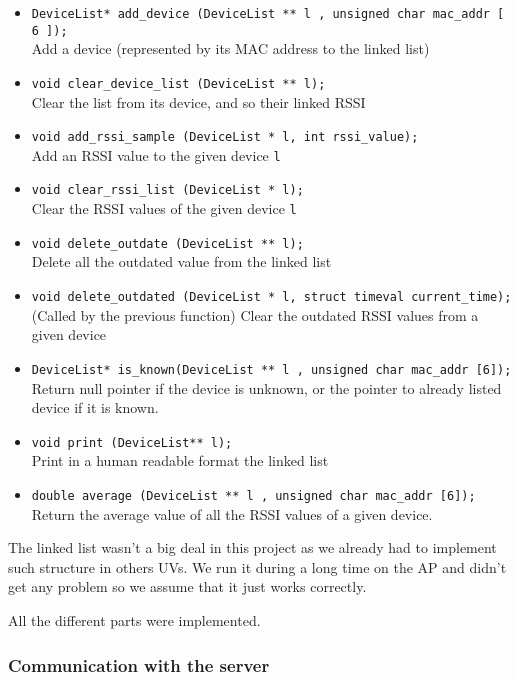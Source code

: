 \begin{itemize}
    \item \verb+DeviceList* add_device (DeviceList ** l , unsigned char mac_addr [ 6 ]);+\\
        Add a device (represented by its MAC address to the linked list)
    \item \verb+void clear_device_list (DeviceList ** l);+\\
        Clear the list from its device, and so their linked RSSI 
    \item \verb+void add_rssi_sample (DeviceList * l, int rssi_value);+\\
        Add an RSSI value to the given device \verb+l+
    \item \verb+void clear_rssi_list (DeviceList * l);+\\
        Clear the RSSI values of the given device \verb+l+
    \item \verb+void delete_outdate (DeviceList ** l);+\\
        Delete all the outdated value from the linked list
    \item \verb+void delete_outdated (DeviceList * l, struct timeval current_time);+\\
        (Called by the previous function) Clear the outdated RSSI values from a
        given device
    \item \verb+DeviceList* is_known(DeviceList ** l , unsigned char mac_addr [6]);+\\
        Return null pointer if the device is unknown, or the pointer to already
        listed device if it is known. 
    \item \verb+void print (DeviceList** l);+\\
        Print in a human readable format the linked list
    \item \verb+double average (DeviceList ** l , unsigned char mac_addr [6]);+\\
        Return the average value of all the RSSI values of a given device.
\end{itemize}

The linked list wasn't a big deal in this project as we already had to
implement such structure in others UVs. We run it during a long time on the AP
and didn't get any problem so we assume that it just works correctly.

All the different parts were implemented.

\subsubsection{Communication with the server}

